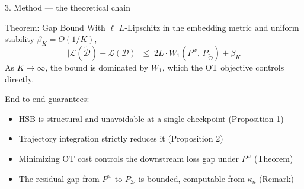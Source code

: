 \documentclass[aspectratio=169,11pt]{beamer}
\newcommand{\Dtrain}{\mathcal{D}}
\newcommand{\Ddist}{\tilde{\mathcal{D}}}
\begin{document}
\begin{frame}{3. Method --- the theoretical chain}
  \begin{block}{Theorem: Gap Bound }
    With $\ell$ $L$-Lipschitz in the embedding metric and uniform stability $\beta_K = O(1/K)$,
    \[
      \bigl|\mathcal{L}(\Ddist) - \mathcal{L}(\Dtrain)\bigr|
      \;\leq\; 2L \cdot W_1(P^w,\,P_{\Ddist}) + \beta_K
    \]
    As $K \to \infty$, the bound is dominated by $W_1$, which the OT objective controls directly.
  \end{block}
  \vfill
  End-to-end guarantees:
  \begin{itemize}
    \item HSB is structural and unavoidable at a single checkpoint \hfill (Proposition 1)
    \item Trajectory integration strictly reduces it \hfill (Proposition 2)
    \item Minimizing OT cost controls the downstream loss gap under $P^w$ \hfill (Theorem)
    \item The residual gap from $P^w$ to $P_{\Dtrain}$ is bounded, computable from $\kappa_n$ \hfill (Remark)
  \end{itemize}
\end{frame}
\end{document}

